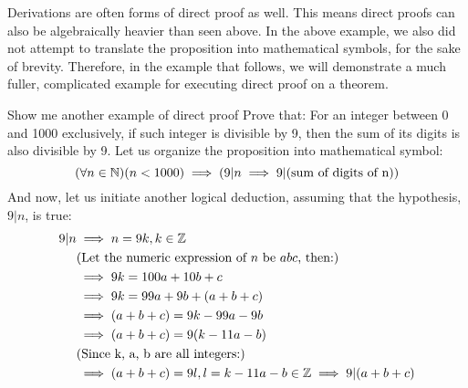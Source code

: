 Derivations are often forms of direct proof as well. This means direct proofs can also be algebraically heavier than seen above. In the above example, we also did not attempt to translate the proposition into mathematical symbols, for the sake of brevity. Therefore, in the example that follows, we will demonstrate a much fuller, complicated example for executing direct proof on a theorem.
\begin{ln-think}{Show me another example of direct proof}{}
    Prove that: For an integer between 0 and 1000 exclusively, if such integer is divisible by 9, then the sum of its digits is also divisible by 9.
    \tcblower
    Let us organize the proposition into mathematical symbol:
    \[(\forall n \in \mathbb{N})(n < 1000) \implies (9|n \implies 9|(\text{sum of digits of n}))\]
    And now, let us initiate another logical deduction, assuming that the hypothesis, $9|n$, is true:
    \begin{align*}
        9|n &\implies n = 9k, k \in \mathbb{Z} \\
        &(\text{Let the numeric expression of $n$ be $abc$, then:}) \\
        &\implies 9k = 100a + 10b + c \\
        &\implies 9k = 99a + 9b + (a + b + c) \\
        &\implies (a + b + c) = 9k - 99a - 9b \\
        &\implies (a + b + c) = 9(k - 11a - b) \\
        &(\text{Since k, a, b are all integers:}) \\
        &\implies (a + b + c) = 9l, l = k - 11a - b \in \mathbb{Z} \implies 9|(a + b + c)
    \end{align*}
\end{ln-think}

